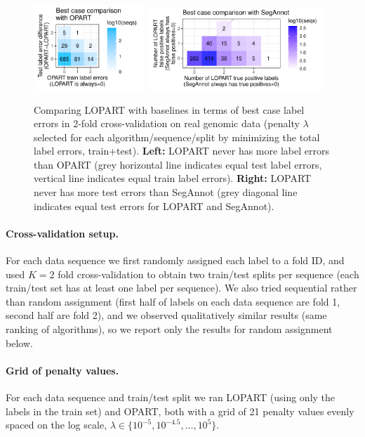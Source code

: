 \documentclass[12pt]{article}
\begin{document}
\begin{figure}
    \centering
    \includegraphics[width=0.37\textwidth]{figure-label-errors.pdf}
    \includegraphics[width=0.6\textwidth]{figure-label-errors-SegAnnot.pdf}
    \caption{Comparing LOPART with baselines in terms of best case label errors in 2-fold cross-validation on real genomic data (penalty $\lambda$ selected for each algorithm/sequence/split by minimizing the total label errors, train+test). 
    \textbf{Left:} LOPART never has more label errors than OPART (grey horizontal line indicates equal test label errors, vertical line indicates equal train label errors).
    \textbf{Right:} LOPART never has more test errors than SegAnnot (grey diagonal line indicates equal test errors for LOPART and SegAnnot). 
    }
    \label{fig:label-errors}
\end{figure}


\paragraph{Cross-validation setup.} For each data sequence we first randomly assigned each label to a fold ID, and used $K=2$ fold cross-validation to obtain two train/test splits per sequence (each train/test set has at least one label per sequence).
We also tried sequential rather than random assignment (first half of labels on each data sequence are fold 1, second half are fold 2), and we observed qualitatively similar results (same ranking of algorithms), so we report only the results for random assignment below.

\paragraph{Grid of penalty values.} For each data sequence and train/test split we ran LOPART (using only the labels in the train set) and OPART, both with a grid of 21 penalty values evenly spaced on the log scale,  $\lambda\in\{10^{-5}, 10^{-4.5}, \dots, 10^5\}$.
\end{document}
